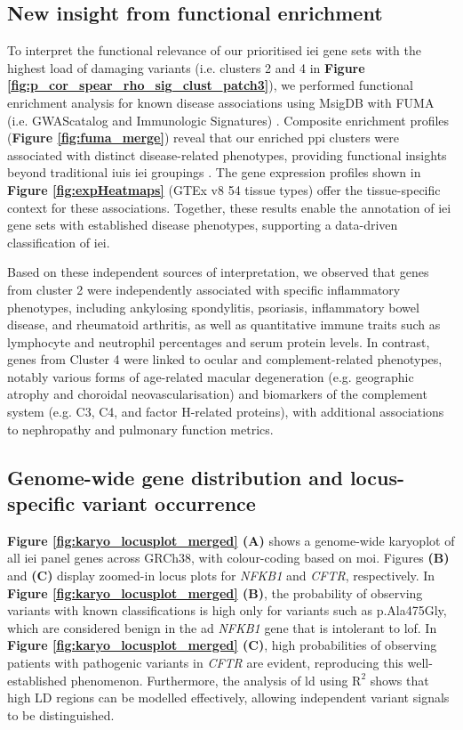 \subsection{New insight from functional enrichment}
To interpret the functional relevance of our prioritised \ac{iei} gene sets with the highest load of damaging variants (i.e. clusters 2 and 4 in \textbf{Figure \ref{fig:p_cor_spear_rho_sig_clust_patch3}}), we performed functional enrichment analysis for known disease associations using MsigDB with FUMA (i.e. GWAScatalog and Immunologic Signatures) \cite{watanabe_functional_2017}. Composite enrichment profiles (\textbf{Figure \ref{fig:fuma_merge}}) reveal that our enriched \ac{ppi} clusters were associated with distinct disease-related phenotypes, providing functional insights beyond traditional \ac{iuis} \ac{iei} groupings \cite{tangye_human_2022}. The gene expression profiles shown in \textbf{Figure \ref{fig:expHeatmaps}} (GTEx v8 54 tissue types) offer the tissue-specific context for these associations. Together, these results enable the annotation of \ac{iei} gene sets with established disease phenotypes, supporting a data-driven classification of \ac{iei}.

Based on these independent sources of interpretation, we observed that genes from cluster 2 were independently associated with specific inflammatory phenotypes, including ankylosing spondylitis, psoriasis, inflammatory bowel disease, and rheumatoid arthritis, as well as quantitative immune traits such as lymphocyte and neutrophil percentages and serum protein levels.
In contrast, genes from Cluster 4 were linked to ocular and complement-related phenotypes, notably various forms of age-related macular degeneration (e.g. geographic atrophy and choroidal neovascularisation) and biomarkers of the complement system (e.g. C3, C4, and factor H-related proteins), with additional associations to nephropathy and pulmonary function metrics.

\subsection{Genome-wide gene distribution and locus-specific variant occurrence}

\textbf{Figure \ref{fig:karyo_locusplot_merged} (A)} shows a genome-wide karyoplot of all \ac{iei} panel genes across GRCh38, with colour-coding based on \ac{moi}. Figures \textbf{(B)} and \textbf{(C)} display zoomed-in locus plots for \textit{NFKB1} and \textit{CFTR}, respectively. 
In \textbf{Figure \ref{fig:karyo_locusplot_merged} (B)}, the probability of observing variants with known classifications is high only for variants such as p.Ala475Gly, which are considered benign in the \ac{ad} \textit{NFKB1} gene that is intolerant to \ac{lof}. 
In \textbf{Figure \ref{fig:karyo_locusplot_merged} (C)}, high probabilities of observing patients with pathogenic variants in \textit{CFTR} are evident, reproducing this well-established phenomenon. Furthermore, the analysis of \ac{ld} using $\text{R}^2$ shows that high LD regions can be modelled effectively, allowing independent variant signals to be distinguished.

